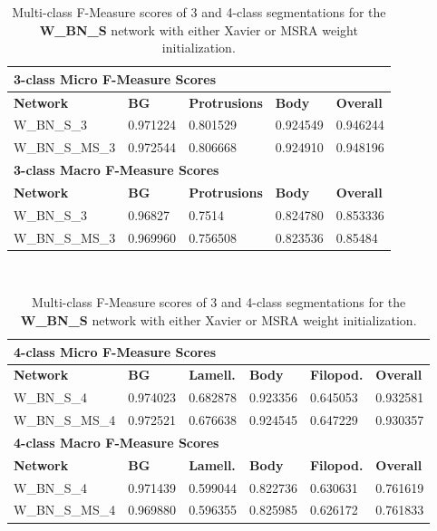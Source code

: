\begin {table}
	\begin{flushleft}
		\begin {tabular}[!htb]{|l|l|l|l|l|}
			\hline\multicolumn{5}{|l|}{\textbf{3-class Micro F-Measure Scores}} \\ \hline
			\textbf{Network}& \textbf{BG}& \textbf{Protrusions}& \textbf{Body}& \textbf{Overall} \\ \hline
			W\_BN\_S\_3& 0.971224& 0.801529& 0.924549& 0.946244 \\ \hline
			W\_BN\_S\_MS\_3& \cellcolor{green!25}0.972544& \cellcolor{green!25}0.806668& \cellcolor{green!25}0.924910& \cellcolor{green!25}0.948196 \\ \hline
			\multicolumn{5}{|l|}{\textbf{3-class Macro F-Measure Scores}} \\ \hline
			\textbf{Network}& \textbf{BG}& \textbf{Protrusions}& \textbf{Body}& \textbf{Overall} \\ \hline
			W\_BN\_S\_3& 0.96827& 0.7514& \cellcolor{green!25}0.824780& 0.853336 \\ \hline
			W\_BN\_S\_MS\_3& \cellcolor{green!25}0.969960& \cellcolor{green!25}0.756508& 0.823536& \cellcolor{green!25}0.85484 \\ \hline
		\end {tabular}
		\vspace{0.5cm}\\
		\begin {tabular}[!htb]{|l|l|l|l|l|l|}
			\hline\multicolumn{6}{|l|}{\textbf{4-class Micro F-Measure Scores}} \\ \hline
			\textbf{Network}& \textbf{BG}& \textbf{Lamell.}& \textbf{Body}& \textbf{Filopod.}& \textbf{Overall} \\ \hline
			W\_BN\_S\_4& \cellcolor{green!25}0.974023& \cellcolor{green!25}0.682878& 0.923356& 0.645053& \cellcolor{green!25}0.932581 \\ \hline
			W\_BN\_S\_MS\_4& 0.972521& 0.676638& \cellcolor{green!25}0.924545& \cellcolor{green!25}0.647229& 0.930357 \\ \hline
			\multicolumn{6}{|l|}{\textbf{4-class Macro F-Measure Scores}} \\ \hline
			\textbf{Network}& \textbf{BG}& \textbf{Lamell.}& \textbf{Body}& \textbf{Filopod.}& \textbf{Overall} \\ \hline
			W\_BN\_S\_4& \cellcolor{green!25}0.971439& \cellcolor{green!25}0.599044& 0.822736& \cellcolor{green!25}0.630631& 0.761619 \\ \hline
			W\_BN\_S\_MS\_4& 0.969880& 0.596355& \cellcolor{green!25}0.825985& 0.626172& \cellcolor{green!25}0.761833 \\ \hline
		\end {tabular}
	\end {flushleft}
\caption[Multi-class F-Measure scores for networks with Xavier and MSRA weight initialization.]{Multi-class F-Measure scores of 3 and 4-class segmentations for the \textbf{W\_BN\_S} network with either Xavier or MSRA weight initialization.}
\label{tab:results4}
\end {table}



